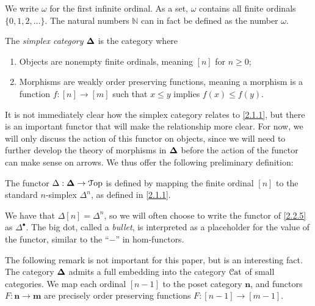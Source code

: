 \begin{notation}\label{2.2.5}
    We write $\omega$ for the first infinite ordinal. As a set, $\omega$ contains all finite ordinals $\{0,1,2,\ldots\}$. The natural numbers $\mathbb{N}$ can in fact be defined as the number $\omega$.
\end{notation}

\begin{definition}\label{2.2.6}
    The \emph{simplex category} $\boldsymbol{\Delta}$ is the category where
    \begin{enumerate}
        \item Objects are nonempty finite ordinals, meaning $[n]$ for $n\geq 0$;
        \item Morphisms are weakly order preserving functions, meaning a morphism is a function $f : [n] \to [m]$ such that $x\leq y$ implies $f(x)\leq f(y)$.
    \end{enumerate}
\end{definition}

It is not immediately clear how the simplex category relates to \cref{2.1.1}, but there is an important functor that will make the relationship more clear. For now, we will only discuss the action of this functor on objects, since we will need to further develop the theory of morphisms in $\boldsymbol{\Delta}$ before the action of the functor can make sense on arrows. We thus offer the following preliminary definition:

\begin{definition}\label{2.2.7}
    The functor $\Delta : \boldsymbol{\Delta}\to\mathcal{T}\mathrm{op}$ is defined by mapping the finite ordinal $[n]$ to the standard $n$-simplex $\Delta^n$, as defined in \cref{2.1.1}.
\end{definition}

\begin{notation}\label{2.2.8}   
We have that $\Delta[n]=\Delta^n$, so we will often choose to write the functor of \cref{2.2.5} as $\Delta^{\bullet}$. The big dot, called a \emph{bullet}, is interpreted as a placeholder for the value of the functor, similar to the ``$-$'' in hom-functors.
\end{notation}

\begin{remark}\label{2.2.9}
    The following remark is not important for this paper, but is an interesting fact. The category $\boldsymbol{\Delta}$ admits a full embedding into the category $\mathcal{C}\mathrm{at}$ of small categories. We map each ordinal $[n-1]$ to the poset category $\mathbf{n}$, and functors $F : \mathbf{n}\to\mathbf{m}$ are precisely order preserving functions $F : [n-1]\to[m-1]$.
\end{remark}
